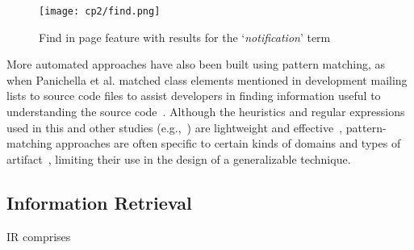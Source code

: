 \medskip
\begin{figure}[h!]
    \centering
    \texttt{[image: cp2/find.png]}
    \caption{Find in page feature with results for the `\textit{notification}' term}
    \label{fig:find-in-page}
\end{figure}


More automated approaches have also been built using pattern matching, 
as when Panichella et al. 
matched class elements mentioned in development mailing 
 lists to source code files
to assist developers in finding information useful to 
 understanding the source code~\cite{panichella2012}.
Although the heuristics and regular expressions used in this and other studies (e.g.,~\cite{nadi2020, Maalej2013})
are lightweight and effective~\cite{Bavota2016}, 
pattern-matching approaches 
are often specific to certain kinds of domains and types of artifact~\cite{fucci2019}, 
limiting their use in the design of a generalizable technique.






\subsection{Information Retrieval }
\label{cp2:information-retrieval}







\acf{IR} comprises 


